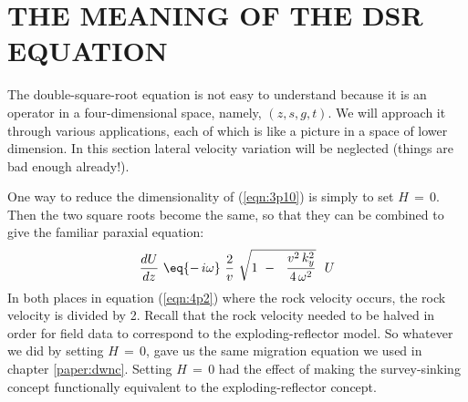 \section{THE MEANING OF THE DSR EQUATION}
\par
The double-square-root equation
is not easy to understand because it is an operator in a
four-dimensional space, namely,  $(z,s,g,t)$.
We will approach it through various applications, each of which is like a
picture in a space of lower dimension.
In this section lateral velocity variation will be neglected
(things are bad enough already!).
\par
One way to reduce the dimensionality of (\ref{eqn:3p10})
is simply to set  $H \,=\, 0$.
Then the two square roots become the same, so that they can be
combined to give the familiar paraxial equation:
\begin{equation}
{dU \over dz }\  \eq 
{ -\,i  \omega } \ {2 \over v }\ \sqrt  { 1 \ -\ 
\  { v^2 \, k_y^2   \over  4 \, \omega^2 } } \ \  U
\label{eqn:4p2}
\end{equation}
In both places in equation (\ref{eqn:4p2}) where the rock velocity occurs,
the rock velocity is divided by 2.
Recall that the rock velocity needed to be halved in order for field
data to correspond to the exploding-reflector model.
So whatever we did by setting  $H \,=\, 0$,
gave us the same migration equation we used in chapter \ref{paper:dwnc}.
Setting  $H\,=\,0$  had the effect of making the survey-sinking concept
functionally equivalent to the exploding-reflector concept.

